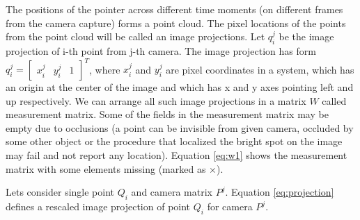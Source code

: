\documentclass[12pt]{article}
\begin{document}
The positions of the pointer across different time moments (on different frames
from the camera  capture) forms a point cloud. The pixel locations of the points
from the point cloud will be  called an image projections. Let $q_i^j$ be the
image projection of i-th point from j-th  camera. The image projection has form
$q_i^j = \begin{bmatrix} x_i^j & y_i^j & 1 \end{bmatrix}^T$, where $x_i^j$ and
$y_i^j$ are  pixel coordinates in a system, which has an origin at the center of
the image and which has x   and y axes pointing left and up respectively. We can
arrange all such image projections in a   matrix $W$ called measurement matrix.
Some of the fields in the measurement matrix may be   empty due to occlusions (a
point can be invisible from given camera, occluded by some other   object or the
procedure that localized the bright spot on the image may fail and not report
any location). Equation \ref{eq:w1} shows the measurement matrix with some
elements missing   (marked as $\times$).


Lets consider single point $Q_i$ and camera matrix $P^j$. Equation
\ref{eq:projection} defines a rescaled image projection of point $Q_i$ for
camera $P^j$.
\end{document}

